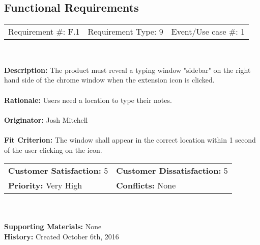 \documentclass[12pt, titlepage]{article}
\begin{document}
\subsection{Functional Requirements}
\begin{framed}
	
	\begin{center}
		
		\begin{tabular}{ l c r }
			Requirement \#: F.1 & Requirement Type: 9 & Event/Use case \#: 1\\
		\end{tabular} \\
	\end{center}
	\textbf{Description:} The product must reveal a typing window "sidebar" on 
	the right hand side of the chrome window when the extension icon is 
	clicked. \\
	\\
	\textbf{Rationale:} Users need a location to type their notes. \\
	\\
	\textbf{Originator:} Josh Mitchell \\
	\\
	\textbf{Fit Criterion:} The window shall appear in the correct location 
	within 1 second of the user clicking on the icon. \\
	
	\begin{tabular}{ll}
		\textbf{Customer Satisfaction:} 5 & \textbf{Customer Dissatisfaction:} 5 \\
		\textbf{Priority:} Very High & \textbf{Conflicts:} None\\
	\end{tabular} \\
	\\
	\textbf{Supporting Materials:} None \\
	\textbf{History:} Created October 6th, 2016
	
\end{framed}
\end{document}
